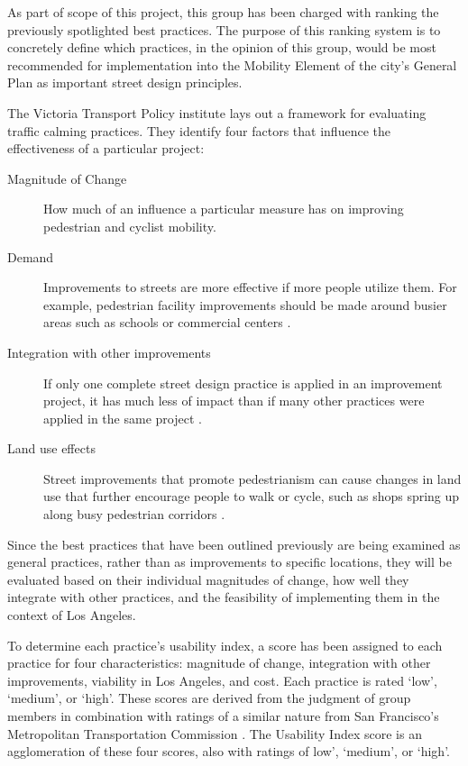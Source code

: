 As part of scope of this project, this group has been charged with ranking the previously spotlighted best practices. The purpose of this ranking system is to concretely define which practices, in the opinion of this group, would be most recommended for implementation into the Mobility Element of the city's General Plan as important street design principles.

The Victoria Transport Policy institute lays out a framework for evaluating traffic calming practices. They identify four factors that influence the effectiveness of a particular project:\begin{description}
	\item[Magnitude of Change] How much of an influence a particular measure has on improving pedestrian and cyclist mobility.
	\item[Demand] Improvements to streets are more effective if more people utilize them.  For example, pedestrian facility improvements should be made around busier areas such as schools or commercial centers \cite{TP3}.
	\item[Integration with other improvements]  If only one complete street design practice is applied in an improvement project, it has much less of impact than if many other practices were applied in the same project \cite{TP3}.
	\item[Land use effects] Street improvements that promote pedestrianism can cause changes in land use that further encourage people to walk or cycle, such as shops spring up along busy pedestrian corridors \cite{TP3}.
\end{description}

Since the best practices that have been outlined previously are being examined as general practices, rather than as improvements to specific locations, they will be evaluated based on their individual magnitudes of change, how well they integrate with other practices, and the feasibility of implementing them in the context of Los Angeles. 

To determine each practice's usability index, a score has been assigned to each practice for four characteristics: magnitude of change, integration with other improvements, viability in Los Angeles, and cost. Each practice is rated `low', `medium', or `high'. These scores are derived from the judgment of group members in combination with ratings of a similar nature from San Francisco's Metropolitan Transportation Commission \cite{PZ7}. The Usability Index score is an agglomeration of these four scores, also with ratings of low', `medium', or `high'.